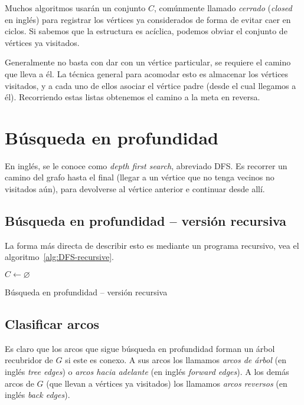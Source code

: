   Muchos algoritmos usarán un conjunto \(C\),
  comúnmente llamado \emph{cerrado}
  (\emph{\foreignlanguage{english}{closed}} en inglés)
  para registrar los vértices ya considerados
  de forma de evitar caer en ciclos.
  Si sabemos que la estructura es acíclica,
  podemos obviar el conjunto de vértices ya visitados.

  Generalmente no basta con dar con un vértice particular,
  se requiere el camino que lleva a él.
  La técnica general para acomodar esto
  es almacenar los vértices visitados,
  y a cada uno de ellos asociar el vértice padre
  (desde el cual llegamos a él).
  Recorriendo estas listas obtenemos el camino a la meta
  en reversa.

\section{Búsqueda en profundidad}
\label{seq:DFS}

  En inglés,
  se le conoce como \emph{\foreignlanguage{english}{depth first search}},
  abreviado DFS.
  Es recorrer un camino del grafo hasta el final
  (llegar a un vértice que no tenga vecinos no visitados aún),
  para devolverse al vértice anterior e continuar desde allí.

\subsection{Búsqueda en profundidad -- versión recursiva}
\label{sec:DFS-recursive}

  La forma más directa de describir esto es mediante un programa recursivo,
  vea el algoritmo~\ref{alg:DFS-recursive}.
  \begin{algorithm}[H]
    \DontPrintSemicolon

    \(C \gets \varnothing\) \;

    \caption{Búsqueda en profundidad -- versión recursiva}
    \label{alg:DFS-recursive}
  \end{algorithm}

\subsection{Clasificar arcos}
\label{sec:clasify-arcs}

  Es claro que los arcos que sigue búsqueda en profundidad
  forman un árbol recubridor de \(G\) si este es conexo.
  A sus arcos los llamamos \emph{arcos de árbol}
  (en inglés \emph{\foreignlanguage{english}{tree edges}})
  o \emph{arcos hacia adelante}
  (en inglés \emph{\foreignlanguage{english}{forward edges}}).
  A los demás arcos de \(G\)
  (que llevan a vértices ya visitados)
  los llamamos \emph{arcos reversos}
  (en inglés \emph{\foreignlanguage{english}{back edges}}).

